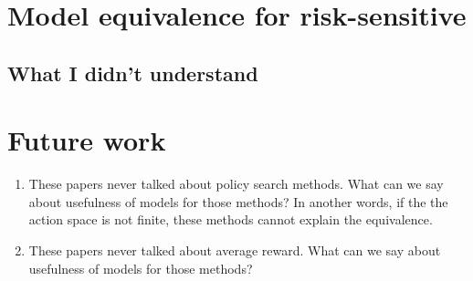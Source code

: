 \documentclass[a4paper]{article}
\theoremstyle{definition}
\theoremstyle{remark}
\theoremstyle{plain}
\begin{document}
\section{Model equivalence for risk-sensitive}
\subsection{What I didn't understand}

\section{Future work}
\begin{enumerate}[label=(\Alph*)]
    \item These papers never talked about policy search methods. What can we say about usefulness of models for those methods? In another words, if the the action space is not finite, these methods cannot explain the equivalence.

    \item These papers never talked about average reward. What can we say about usefulness of models for those methods? 
\end{enumerate}


\end{document}
